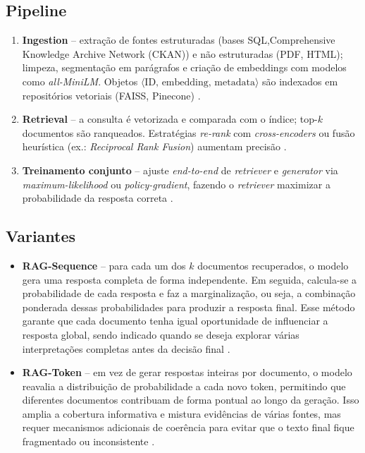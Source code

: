 \subsection{Pipeline}
\label{sec:rag:pipeline}
\begin{enumerate}[label=\arabic*.]
  \item \textbf{Ingestion} – extração de fontes estruturadas (bases SQL,Comprehensive Knowledge Archive Network (CKAN))
        e não estruturadas (PDF, HTML); limpeza, segmentação em parágrafos e
        criação de embeddings com modelos como \textit{all-MiniLM}.
        Objetos $\langle\text{ID},\,\text{embedding},\,\text{metadata}\rangle$
        são indexados em repositórios vetoriais (FAISS, Pinecone)
        \cite{qwak2024integrating,taipalus2024vector}.
  \item \textbf{Retrieval} – a consulta é vetorizada e comparada com o índice;
        top-$k$ documentos são ranqueados. Estratégias \emph{re-rank} com
        \textit{cross-encoders} ou fusão heurística (ex.: \textit{Reciprocal
        Rank Fusion}) aumentam precisão \cite{edwards2024hybrid}.
  \item \textbf{Treinamento conjunto} – ajuste \textit{end-to-end} de
        \textit{retriever} e \textit{generator} via
        \textit{maximum-likelihood} ou \textit{policy-gradient}, fazendo o
        \textit{retriever} maximizar a probabilidade da resposta correta
        \cite{zhang2025fine}.
\end{enumerate}

\subsection{Variantes}
\begin{itemize}
  \item \textbf{RAG-Sequence} – para cada um dos $k$ documentos recuperados, o modelo gera uma resposta completa de forma independente. Em seguida, calcula-se a probabilidade de cada resposta e faz a marginalização, ou seja, a combinação ponderada dessas probabilidades para produzir a resposta final. Esse método garante que cada documento tenha igual oportunidade de influenciar a resposta global, sendo indicado quando se deseja explorar várias interpretações completas antes da decisão final \cite{lewis2020rag,edwards2024hybrid}.
  \item \textbf{RAG-Token} – em vez de gerar respostas inteiras por documento, o modelo reavalia a distribuição de probabilidade a cada novo token, permitindo que diferentes documentos contribuam de forma pontual ao longo da geração. Isso amplia a cobertura informativa e mistura evidências de várias fontes, mas requer mecanismos adicionais de coerência para evitar que o texto final fique fragmentado ou inconsistente \cite{zhang2025fine}.
\end{itemize}

